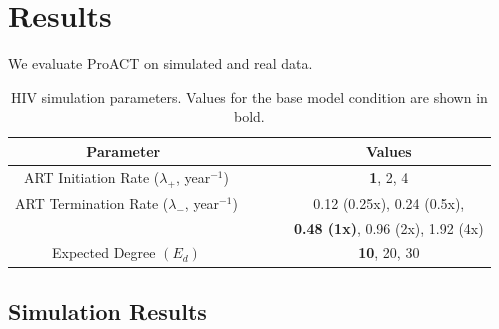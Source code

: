 \documentclass[a4paper,11pt]{article}
\begin{document}

\section{Results}
We evaluate ProACT on simulated and real data. 

\begin{table}[!t]
\begin{center}
\begin{tabular}{c c}
\toprule
\textbf{Parameter~~~~~~} & \textbf{Values}\\
\toprule
ART Initiation Rate ($\lambda_+$, year$^{-1}$)~~~~~~ & \textbf{1}, 2, 4\\
\hdashline
ART Termination Rate ($\lambda_-$, year$^{-1}$)~~~~~~ & 0.12 (0.25x), 0.24 (0.5x),\\
~~~~~~ & \textbf{0.48 (1x)}, 0.96 (2x), 1.92 (4x)\\
\hdashline
Expected Degree $\left(E_d\right)$~~~~~~ & \textbf{10}, 20, 30\\
\bottomrule
\end{tabular}
\end{center}
\caption{HIV simulation parameters. Values for the base model condition are shown in bold.}
\label{tab:favites}
\end{table}

\subsection{Simulation Results}
\end{document}
